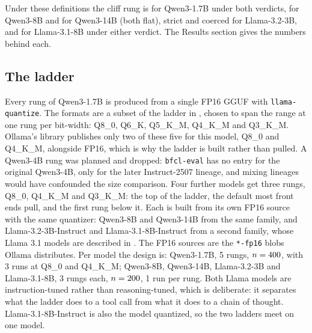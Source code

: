 \documentclass[12pt,letterpaper]{article}
\newcommand{\qm}{Qwen3-1.7B}
\begin{document}
Under these definitions the cliff rung is \qtCliffStrict{} for \qm{} under both verdicts, \qtCliffStrictEightB{} for Qwen3-8B and \qtCliffStrictFourteenB{} for Qwen3-14B (both flat), \qtCliffStrictLlamaThreeB{} strict and \qtCliffCoercedLlamaThreeB{} coerced for Llama-3.2-3B, and \qtCliffStrictLlamaEightB{} for Llama-3.1-8B under either verdict. The Results section gives the numbers behind each.

\subsection{The ladder}
Every rung of \qm{} \citep{qwen3} is produced from a single FP16 GGUF with \texttt{llama-quantize}. The formats are a subset of the ladder in \citet{kurt2026quant}, chosen to span the range at one rung per bit-width: Q8\_0, Q6\_K, Q5\_K\_M, Q4\_K\_M and Q3\_K\_M. Ollama's library publishes only two of these five for this model, Q8\_0 and Q4\_K\_M, alongside FP16, which is why the ladder is built rather than pulled. A Qwen3-4B rung was planned and dropped: \texttt{bfcl-eval} has no entry for the original Qwen3-4B, only for the later Instruct-2507 lineage, and mixing lineages would have confounded the size comparison. Four further models get three rungs, Q8\_0, Q4\_K\_M and Q3\_K\_M: the top of the ladder, the default most front ends pull, and the first rung below it. Each is built from its own FP16 source with the same quantizer: Qwen3-8B and Qwen3-14B from the same family, and Llama-3.2-3B-Instruct and Llama-3.1-8B-Instruct from a second family, whose Llama 3.1 models are described in \citet{llama3}. The FP16 sources are the \texttt{*-fp16} blobs Ollama distributes. Per model the design is: \qm{}, 5 rungs, $n=400{}$, with 3 runs at Q8\_0 and Q4\_K\_M; Qwen3-8B, Qwen3-14B, Llama-3.2-3B and Llama-3.1-8B, 3 rungs each, $n=200{}$, 1 run per rung. Both Llama models are instruction-tuned rather than reasoning-tuned, which is deliberate: it separates what the ladder does to a tool call from what it does to a chain of thought. Llama-3.1-8B-Instruct is also the model \citet{kurt2026quant} quantized, so the two ladders meet on one model.
\end{document}
